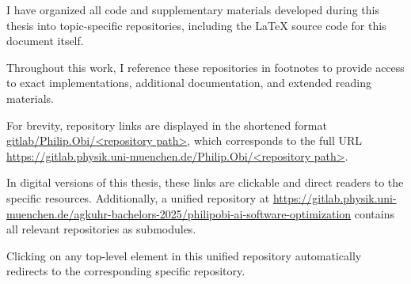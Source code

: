 \sloppy
\setlength{\parskip}{5pt}

I have organized all code and supplementary materials developed during this thesis into topic-specific repositories, including the LaTeX source code for this document itself.

Throughout this work, I reference these repositories in footnotes to provide access to exact implementations, additional documentation, and extended reading materials.

For brevity, repository links are displayed in the shortened format \uline{gitlab/Philip.Obi/\textless repository path\textgreater}, which corresponds to the full URL \uline{https://gitlab.physik.uni-muenchen.de/Philip.Obi/\textless repository path\textgreater}.

In digital versions of this thesis, these links are clickable and direct readers to the specific resources.
Additionally, a unified repository at
\href{
    https://gitlab.physik.uni-muenchen.de/agkuhr-bachelors-2025/philipobi-ai-software-optimization
}{https://gitlab.physik.uni-muenchen.de/\allowbreak agkuhr-bachelors-2025/\allowbreak philipobi-ai-software-optimization} 
contains all relevant repositories as submodules.

Clicking on any top-level element in this unified repository automatically redirects to the corresponding specific repository.